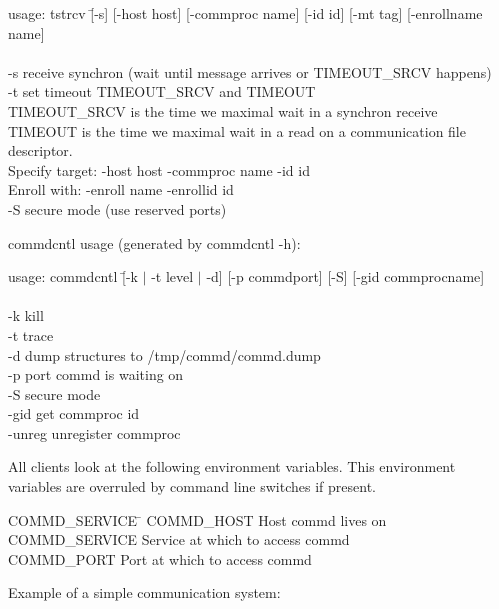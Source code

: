 \begin{tabbing}
usage: tstrcv \=[-s] [-host host] [-commproc name] [-id id] [-mt tag] [-enrollname name] \\ 
\>	[-enrollid id] [-t timeout] [-p commdport] [-S]\\
\>	-s receive synchron (wait until message arrives or TIMEOUT\_SRCV happens)\\
\>	-t set timeout TIMEOUT\_SRCV and TIMEOUT\\
\>	TIMEOUT\_SRCV is the time we maximal wait in a synchron receive\\
\>	TIMEOUT is the time we maximal wait in a read on a communication file descriptor.\\
Specify target: -host host -commproc name -id id\\
Enroll with: -enroll name -enrollid id\\
\>	-S secure mode (use reserved ports)\\
\end{tabbing}

commdcntl usage (generated by commdcntl -h):

\begin{tabbing}
usage: commdcntl \=[-k $\mid$ -t level $\mid$ -d] [-p commdport] [-S] [-gid commprocname] \\ 
\\
\>	-k kill\\
\>	-t trace\\
\>	-d dump structures to /tmp/commd/commd.dump\\
\>	-p port commd is waiting on\\
\>	-S secure mode\\
\>      -gid get commproc id\\
\>      -unreg unregister commproc\\
\end{tabbing}


All clients look at the following environment variables. This
environment variables are overruled by command line switches if present.
\begin{tabbing}
COMMD\_SERVICE \= \kill
COMMD\_HOST      \>Host commd lives on\\
COMMD\_SERVICE   \>Service at which to access commd\\
COMMD\_PORT      \>Port at which to access commd\\
\end{tabbing}

Example of a simple communication system:


